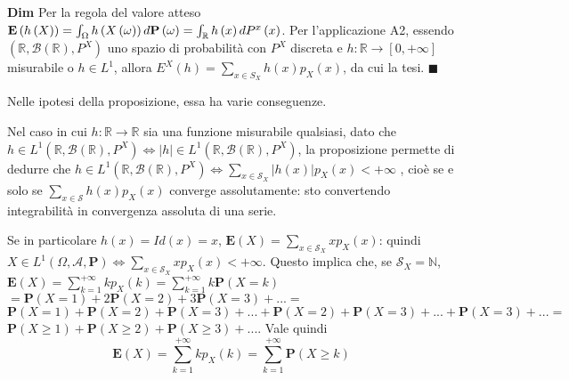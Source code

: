 \documentclass{article}
\begin{document}
\textbf{Dim} Per la regola del valore atteso $\mathbf{E}\left( h\left(
X\right) \right) =\int_{\Omega }h\left( X\left( \omega \right) \right) d%
\mathbf{P}\left( \omega \right) =\int_{%
\mathbb{R}
}h\left( x\right) dP^{x}\left( x\right) $. Per l'applicazione A2, essendo $%
\left( 
\mathbb{R}
,\mathcal{B}\left( 
\mathbb{R}
\right) ,P^{X}\right) $ uno spazio di probabilit\`{a} con $P^{X}$ discreta e 
$h:%
\mathbb{R}
\rightarrow \left[ 0,+\infty \right] $ misurabile o $h\in L^{1}$, allora $%
E^{X}\left( h\right) =\sum_{x\in S_{X}}h\left( x\right) p_{X}\left( x\right) 
$, da cui la tesi. $\blacksquare $

Nelle ipotesi della proposizione, essa ha varie conseguenze.

Nel caso in cui $h:%
\mathbb{R}
\rightarrow 
\mathbb{R}
$ sia una funzione misurabile qualsiasi, dato che $h\in L^{1}\left( 
\mathbb{R}
,\mathcal{B}\left( 
\mathbb{R}
\right) ,P^{X}\right) \Longleftrightarrow \left\vert h\right\vert \in
L^{1}\left( 
\mathbb{R}
,\mathcal{B}\left( 
\mathbb{R}
\right) ,P^{X}\right) $, la proposizione permette di dedurre che $h\in
L^{1}\left( 
\mathbb{R}
,\mathcal{B}\left( 
\mathbb{R}
\right) ,P^{X}\right) \Longleftrightarrow \sum_{x\in \mathcal{S}%
_{X}}\left\vert h\left( x\right) \right\vert p_{X}\left( x\right) <+\infty $%
, cio\`{e} se e solo se $\sum_{x\in \mathcal{S}}h\left( x\right) p_{X}\left(
x\right) $ converge assolutamente: sto convertendo integrabilit\`{a} in
convergenza assoluta di una serie.

Se in particolare $h\left( x\right) =Id\left( x\right) =x$, $\mathbf{E}%
\left( X\right) =\sum_{x\in \mathcal{S}_{X}}xp_{X}\left( x\right) $: quindi $%
X\in L^{1}\left( \Omega ,\mathcal{A},\mathbf{P}\right) \Longleftrightarrow
\sum_{x\in \mathcal{S}_{X}}xp_{X}\left( x\right) <+\infty $. Questo implica
che, se $\mathcal{S}_{X}=%
\mathbb{N}
$, $\mathbf{E}\left( X\right) =\sum_{k=1}^{+\infty }kp_{X}\left( k\right)
=\sum_{k=1}^{+\infty }k\mathbf{P}\left( X=k\right) $ $=\mathbf{P}\left(
X=1\right) +2\mathbf{P}\left( X=2\right) +3\mathbf{P}\left( X=3\right) +...=$
$\mathbf{P}\left( X=1\right) +\mathbf{P}\left( X=2\right) +\mathbf{P}\left(
X=3\right) +...+\mathbf{P}\left( X=2\right) +\mathbf{P}\left( X=3\right)
+...+\mathbf{P}\left( X=3\right) +...=$ $\mathbf{P}\left( X\geq 1\right) +%
\mathbf{P}\left( X\geq 2\right) +\mathbf{P}\left( X\geq 3\right) +...$. Vale
quindi%
\begin{equation*}
\mathbf{E}\left( X\right) =\sum_{k=1}^{+\infty }kp_{X}\left( k\right)
=\sum_{k=1}^{+\infty }\mathbf{P}\left( X\geq k\right)
\end{equation*}
\end{document}
